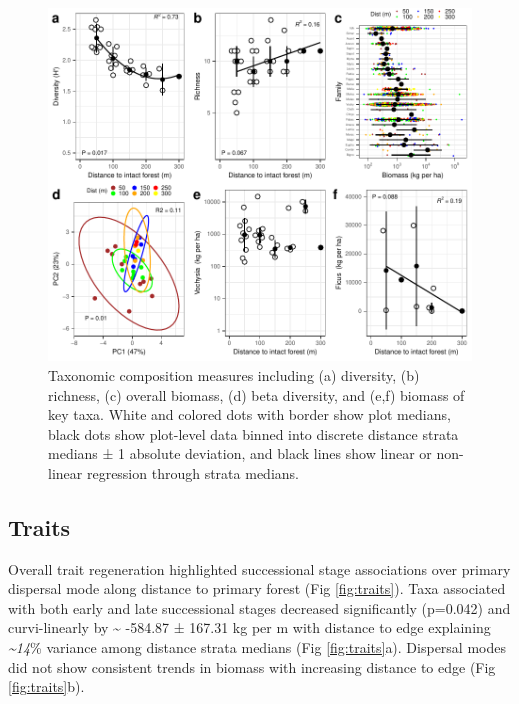 \documentclass[
  12pt,
]{article}
\begin{document}
\begin{figure}
\centering
\includegraphics{merge_files/figure-latex/taxa-1.pdf}
\caption{\label{fig:taxa} Taxonomic composition measures including (a) diversity, (b) richness, (c) overall biomass, (d) beta diversity, and (e,f) biomass of key taxa. White and colored dots with border show plot medians, black dots show plot-level data binned into discrete distance strata medians ± 1 absolute deviation, and black lines show linear or non-linear regression through strata medians.}
\end{figure}

\hypertarget{traits}{%
\subsection{Traits}\label{traits}}

Overall trait regeneration highlighted successional stage associations over primary dispersal mode along distance to primary forest
(Fig \ref{fig:traits}).
Taxa associated with both early and late successional stages decreased significantly
(p=0.042)
and curvi-linearly
by
\textasciitilde{} -584.87 ±
167.31 kg per m
with distance to edge explaining
\emph{\textasciitilde14}\% variance
among distance strata medians
(Fig \ref{fig:traits}a).
Dispersal modes did not show consistent trends in biomass with increasing distance to edge
(Fig \ref{fig:traits}b).
\end{document}
